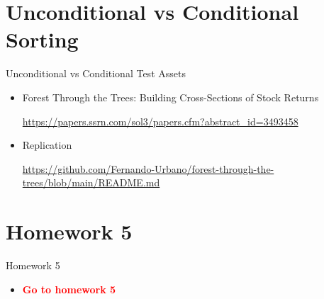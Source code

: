 \documentclass{beamer}
\newcommand{\highlightred}[1]{\textcolor{red}{\textbf{#1}}}
\begin{document}
\section{Unconditional vs Conditional Sorting}
\begin{frame}{Unconditional vs Conditional Test Assets}
    \begin{itemize}
        \item Forest Through the Trees: Building Cross-Sections of Stock Returns
        
        \url{https://papers.ssrn.com/sol3/papers.cfm?abstract_id=3493458}
        
        \item Replication
        
        \url{https://github.com/Fernando-Urbano/forest-through-the-trees/blob/main/README.md}
    \end{itemize}
\end{frame}

\section{Homework 5}
\begin{frame}{Homework 5}
    \begin{itemize}
        \item \highlightred{Go to homework 5}
    \end{itemize}
\end{frame}
\end{document}
